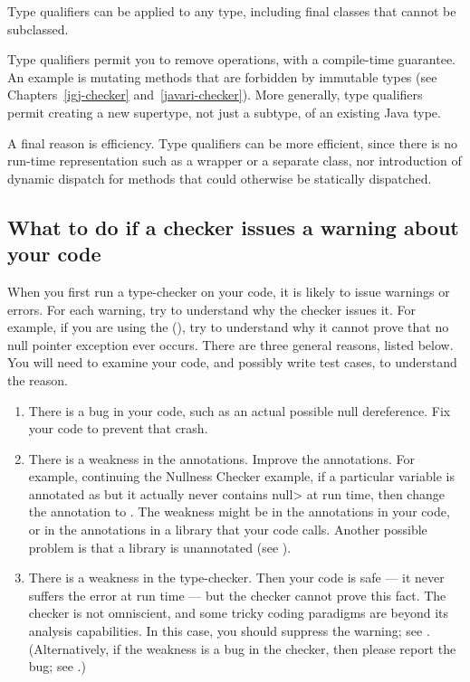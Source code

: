 Type qualifiers can be applied to any type, including final classes that
cannot be subclassed.

Type qualifiers permit you to remove operations, with a compile-time
guarantee.  An example is mutating methods that are forbidden by immutable
types (see Chapters~\ref{igj-checker} and~\ref{javari-checker}).  More
generally, type qualifiers permit creating a new supertype, not just a
subtype, of an existing Java type.

A final reason is efficiency.  Type qualifiers can be more
efficient, since there is no run-time representation such as a wrapper
or a separate class, nor introduction of dynamic dispatch for methods that
could otherwise be statically dispatched.


\subsection{What to do if a checker issues a warning about your code\label{handling-warnings}}

When you first run a type-checker on your code, it is likely to issue
warnings or errors.  For each warning, try to understand why the checker
issues it.  For example, if you are using the
(), try to understand why it cannot prove
that no null pointer exception ever occurs.  There are three general
reasons, listed below.  You will need to
examine your code, and possibly write test cases, to understand the reason.

\begin{enumerate}
\item
There is a bug in your code, such as an actual possible null dereference.
Fix your code to prevent that crash.

\item
There is a weakness in the annotations.  Improve the annotations.
For example, continuing the Nullness Checker example, if a particular
variable is annotated as  but it
actually never contains \<null> at run time, then change the annotation to 
.  The weakness might be in the
annotations in your code, or in the annotations in a library that your code
calls.  Another possible problem is that a library is unannotated (see
).

\item
There is a weakness in the type-checker.  Then your code is safe --- it never
suffers the error at run time --- but the checker cannot prove this
fact.  The checker is not omniscient, and some
tricky coding paradigms are beyond its analysis capabilities.  In this
case, you should suppress the warning; see
.  (Alternatively, if the weakness is
a bug in the checker, then  please report the bug; see
.)
\end{enumerate}

